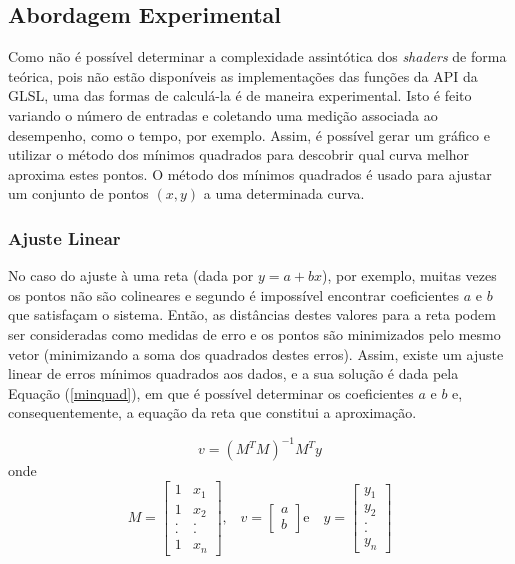 {	\subsection{Abordagem Experimental}
	\label{metminqua}

	Como não é possível determinar a complexidade assintótica dos \textit{shaders} de forma teórica, pois não estão disponíveis as implementações das funções da API da GLSL, uma das formas de calculá-la é de maneira experimental. Isto é feito variando o número de entradas e coletando uma medição associada ao desempenho, como o tempo, por exemplo. Assim, é possível gerar um gráfico e utilizar o método dos mínimos quadrados para descobrir qual curva melhor aproxima estes pontos. O método dos mínimos quadrados é usado para ajustar um conjunto de pontos $(x,y)$ a uma determinada curva. 

	\subsubsection{Ajuste Linear}

	No caso do ajuste à uma reta (dada por $y = a + bx$), por exemplo, muitas vezes os pontos não são colineares e segundo \cite{minq} é impossível encontrar coeficientes $a$ e $b$ que satisfaçam o sistema.  Então, as distâncias destes valores para a reta podem ser consideradas como medidas de erro e os pontos são minimizados pelo mesmo vetor (minimizando a soma dos quadrados destes erros).  Assim, existe um ajuste linear de erros mínimos quadrados aos dados, e a sua solução é dada pela Equação (\ref{minquad}), em que é possível determinar os coeficientes $a$ e $b$ e, consequentemente, a equação da reta que constitui a aproximação. 

	\begin{equation}
		v =( M^{T}M)^{-1}M^{T}y
	\label{minquad}
	\end{equation}
	onde
	\begin{equation}
	M = \left[\begin{array}{cc}
               	1 & x_{1} \\
               	1 & x_{2}  \\
		. & .  \\
               	. & .  \\
		1 & x_{n}
          	         \end{array}\right] \mbox{,} \quad
	v = \left[\begin{array}{c}
               	a \\
               	b  
          	         \end{array}\right] \mbox{e} \quad
	y = \left[\begin{array}{c}
               	y_{1} \\
               	y_{2}  \\
		.   \\
               	.   \\
		y_{n}
          	         \end{array}\right] 	
	\label{variaveis}
	\end{equation}

}

